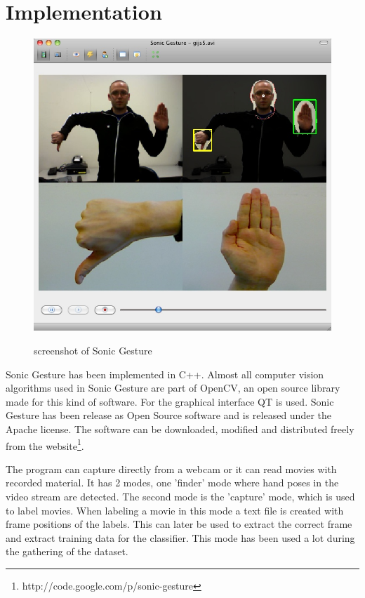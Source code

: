 \section{Implementation}

\begin{figure}[ht]
\begin{center}
\label{fig:sonicgesture}
\includegraphics[width=\linewidth]{figures/sonicgesture.jpg}
\end{center}
\caption{screenshot of Sonic Gesture}
\end{figure}

Sonic Gesture has been implemented in C++. Almost all computer vision algorithms used in Sonic Gesture are part of OpenCV, an open source library made for this kind of software. For the graphical interface QT is used. Sonic Gesture has been release as Open Source software and is released under the Apache license. The software can be downloaded, modified and distributed freely from the website\footnote{http://code.google.com/p/sonic-gesture}.

The program can capture directly from a webcam or it can read movies with recorded material. It has 2 modes, one 'finder' mode where hand poses in the video stream are detected. The second mode is the 'capture' mode, which is used to label movies. When labeling a movie in this mode a text file is created with frame positions of the labels. This can later be used to extract the correct frame and extract training data for the classifier. This mode has been used a lot during the gathering of the dataset.

